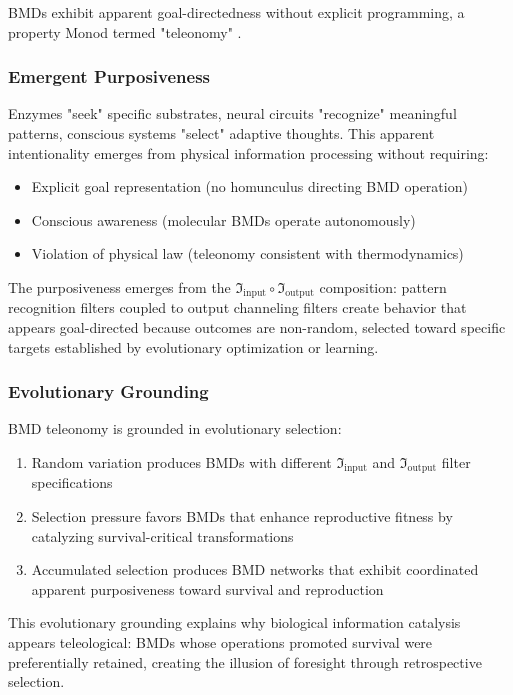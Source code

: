 BMDs exhibit apparent goal-directedness without explicit programming, a property Monod termed "teleonomy" \cite{Monod1971}.

\subsubsection{Emergent Purposiveness}

Enzymes "seek" specific substrates, neural circuits "recognize" meaningful patterns, conscious systems "select" adaptive thoughts. This apparent intentionality emerges from physical information processing without requiring:

\begin{itemize}
\item Explicit goal representation (no homunculus directing BMD operation)
\item Conscious awareness (molecular BMDs operate autonomously)
\item Violation of physical law (teleonomy consistent with thermodynamics)
\end{itemize}

The purposiveness emerges from the \(\Im_{\text{input}} \circ \Im_{\text{output}}\) composition: pattern recognition filters coupled to output channeling filters create behavior that appears goal-directed because outcomes are non-random, selected toward specific targets established by evolutionary optimization or learning.

\subsubsection{Evolutionary Grounding}

BMD teleonomy is grounded in evolutionary selection:

\begin{enumerate}
\item Random variation produces BMDs with different \(\Im_{\text{input}}\) and \(\Im_{\text{output}}\) filter specifications

\item Selection pressure favors BMDs that enhance reproductive fitness by catalyzing survival-critical transformations

\item Accumulated selection produces BMD networks that exhibit coordinated apparent purposiveness toward survival and reproduction
\end{enumerate}

This evolutionary grounding explains why biological information catalysis appears teleological: BMDs whose operations promoted survival were preferentially retained, creating the illusion of foresight through retrospective selection.

